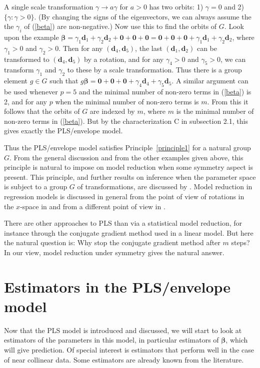 \documentclass[a4paper, 11pt]{article}
\begin{document}
A single scale transformation $\gamma\rightarrow a\gamma$ for $a>0$ has two orbits: 1) $\gamma=0$ and 2) $\{\gamma: \gamma>0\}$. (By changing the signs of the eigenvectors, we can always assume the the $\gamma_i$ of (\ref{beta}) are non-negative.) Now use this to find the orbits of $G$. Look upon the example $\bm{\beta}=\gamma_1\bm{d}_1+\gamma_2\bm{d}_2+\bm{0}+\bm{0}+\bm{0}=\bm{0}+\bm{0}+\bm{0}+\gamma_1\bm{d}_1
+\gamma_2\bm{d}_2$, where $\gamma_1 > 0$ and $\gamma_2 > 0$. Then for any $(\bm{d}_4,\bm{d}_5)$, the last  $(\bm{d}_1,\bm{d}_2)$ can be transformed to $(\bm{d}_4,\bm{d}_5)$ by a rotation, and for any $\gamma_4 > 0$ and $\gamma_5 > 0$, we can transform $\gamma_1$ and $\gamma_2$ to these by a scale transformation. Thus there is a group element $g\in G$ such that $g\bm{\beta}=\bm{0}+\bm{0}+\bm{0}+\gamma_4\bm{d}_4
+\gamma_5\bm{d}_5$. A similar argument can be used whenever $p=5$ and the minimal number of non-zero terms in (\ref{beta}) is 2, and for any $p$ when the minimal number of non-zero terms is $m$.  From this it follows that the orbits of $G$ are indexed by $m$, where $m$ is the minimal number of non-zero terms in (\ref{beta}). But by the characterization C in subsection 2.1, this gives exactly the PLS/envelope model.

Thus the PLS/envelope model satisfies Principle~\ref{principle1} for a natural group $G$. From the general discussion and from the other examples given above, this principle is natural to impose on model reduction when some symmetry aspect is present. This principle, and further results on inference when the parameter space is subject to a group $G$ of transformations, are discussed by \citet{helland2004statistical, helland2010steps}. Model reduction in regression models is discussed in general from the point of view of rotations in the $x$-space in \citet{helland2001reduction} and from a different point of view in \citet{helland2000model}.

There are other approaches to PLS than via a statistical model reduction, for instance through the conjugate gradient method used in a linear model. But here the natural question is: Why stop the conjugate gradient method after $m$ steps? In our view, model reduction under symmetry gives the natural answer.


\section{Estimators in the PLS/envelope model}

Now that the PLS model is introduced and discussed, we will start to look at estimators of the parameters in this model, in particular estimators of $\bm{\beta}$, which will give prediction. Of special interest is estimators that perform well in the case of near collinear data. Some estimators are already known from the literature.
\end{document}
